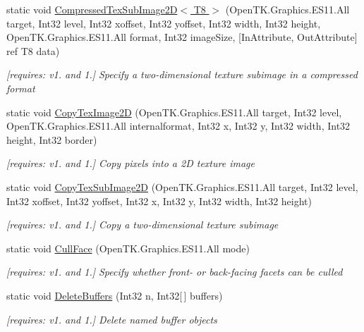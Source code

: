 \begin{DoxyCompactItemize}
static void \hyperlink{class_open_t_k_1_1_graphics_1_1_e_s11_1_1_g_l_ae6198a82fa0fc1cb30ac2397093e6048}{Compressed\-Tex\-Sub\-Image2\-D$<$ T8 $>$} (Open\-T\-K.\-Graphics.\-E\-S11.\-All target, Int32 level, Int32 xoffset, Int32 yoffset, Int32 width, Int32 height, Open\-T\-K.\-Graphics.\-E\-S11.\-All format, Int32 image\-Size, \mbox{[}In\-Attribute, Out\-Attribute\mbox{]} ref T8 data)
\begin{DoxyCompactList}\small\item\em \mbox{[}requires\-: v1. and 1.\mbox{]} Specify a two-\/dimensional texture subimage in a compressed format \end{DoxyCompactList}\item 
static void \hyperlink{class_open_t_k_1_1_graphics_1_1_e_s11_1_1_g_l_a8eaf46f4fa35ac6845a262e7d0776654}{Copy\-Tex\-Image2\-D} (Open\-T\-K.\-Graphics.\-E\-S11.\-All target, Int32 level, Open\-T\-K.\-Graphics.\-E\-S11.\-All internalformat, Int32 x, Int32 y, Int32 width, Int32 height, Int32 border)
\begin{DoxyCompactList}\small\item\em \mbox{[}requires\-: v1. and 1.\mbox{]} Copy pixels into a 2\-D texture image \end{DoxyCompactList}\item 
static void \hyperlink{class_open_t_k_1_1_graphics_1_1_e_s11_1_1_g_l_af2ce341247d2c1563b5a7c51c3aff6c6}{Copy\-Tex\-Sub\-Image2\-D} (Open\-T\-K.\-Graphics.\-E\-S11.\-All target, Int32 level, Int32 xoffset, Int32 yoffset, Int32 x, Int32 y, Int32 width, Int32 height)
\begin{DoxyCompactList}\small\item\em \mbox{[}requires\-: v1. and 1.\mbox{]} Copy a two-\/dimensional texture subimage \end{DoxyCompactList}\item 
static void \hyperlink{class_open_t_k_1_1_graphics_1_1_e_s11_1_1_g_l_a106f96e00bd2a6df37936b8223e9872a}{Cull\-Face} (Open\-T\-K.\-Graphics.\-E\-S11.\-All mode)
\begin{DoxyCompactList}\small\item\em \mbox{[}requires\-: v1. and 1.\mbox{]} Specify whether front-\/ or back-\/facing facets can be culled \end{DoxyCompactList}\item 
static void \hyperlink{class_open_t_k_1_1_graphics_1_1_e_s11_1_1_g_l_afbd6255ea9de95e551c838d66cd2264f}{Delete\-Buffers} (Int32 n, Int32\mbox{[}$\,$\mbox{]} buffers)
\begin{DoxyCompactList}\small\item\em \mbox{[}requires\-: v1. and 1.\mbox{]} Delete named buffer objects \end{DoxyCompactList}\item 

\end{DoxyCompactItemize}
